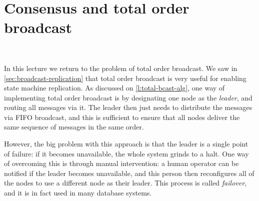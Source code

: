 {
}

\section{Consensus and total order broadcast}\label{sec:consensus}

\begin{frame}
    \begin{center}
        {\Large{\color{darkblue}{Consensus and total order broadcast}}} \\[2em]
        \mydetails
    \end{center}
\end{frame}

In this lecture we return to the problem of total order broadcast.
We saw in \autoref{sec:broadcast-replication} that total order broadcast is very useful for enabling state machine replication.
As discussed on \autoref{l:total-bcast-alg}, one way of implementing total order broadcast is by designating one node as the \emph{leader}, and routing all messages via it.
The leader then just needs to distribute the messages via FIFO broadcast, and this is sufficient to ensure that all nodes deliver the same sequence of messages in the same order.

However, the big problem with this approach is that the leader is a single point of failure: if it becomes unavailable, the whole system grinds to a halt.
One way of overcoming this is through manual intervention: a human operator can be notified if the leader becomes unavailable, and this person then reconfigures all of the nodes to use a different node as their leader.
This process is called \emph{failover}, and it is in fact used in many database systems.

